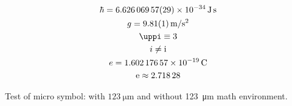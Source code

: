 \begin{gather}
	\hbar = \SI[separate-uncertainty=false]{6.62606957(29)e-34}{\joule\second}\\
	g = \SI{9.81(1)}{\meter \per \s^2}\\
	\pi \equiv 3\\
	i \neq \i\\
	e = \SI{1.60217657e-19}{\coulomb}\\
	\e \approx \num{2.71828}\\
\end{gather}

Test of micro symbol: with $\SI{123}{\micro\meter}$ and without \SI{123}{\micro\meter} math environment.